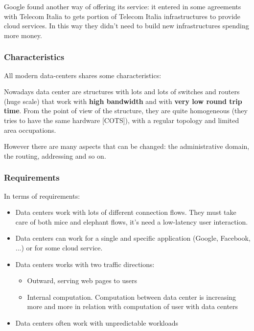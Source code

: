         Google found another way of offering its service: it entered in some agreements with Telecom Italia to gets portion of Telecom Italia infrastructures to provide cloud services. In this way they didn't need to build new infrastructures spending more money.
        
        
        
    \subsubsection{Characteristics}
        All modern data-centers shares some characteristics:
        
        Nowadays data center are structures with lots and lots of switches and routers (huge scale) that work with \textbf{high bandwidth} and with \textbf{very low round trip time}. From the point of view of the structure, they are quite homogeneous (they tries to have the same hardware [COTS]), with a regular topology and limited area occupations.
    
        However there are many aspects that can be changed:  the administrative domain, the routing, addressing and so on.
    
    
    \subsubsection{Requirements}
        In terms of requirements:
        \begin{itemize}
            \item Data centers work with lots of different connection flows. They must take care of both mice and elephant flows, it's need a low-latency user interaction.
            \item Data centers can work for a single and specific application (Google, Facebook, ...) or for some cloud service.
            \item Data centers works with two traffic directions:
            \begin{itemize}
                \item Outward, serving web pages to users
                \item Internal computation. Computation between data center is increasing more and more in relation with computation of user with data centers
            \end{itemize}
            \item Data centers often work with unpredictable workloads
        \end{itemize}
        
